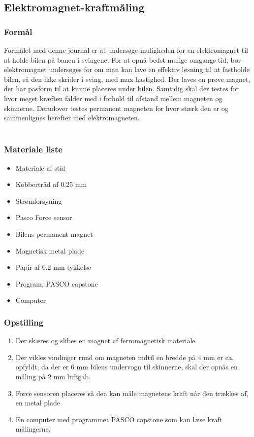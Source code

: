 \newpage 
\subsection{Elektromagnet-kraftmåling}\label{bilag_elektromagnet}
\subsubsection*{Formål}
Formålet med denne journal er at undersøge muligheden for en elektromagnet til at holde bilen på banen i svingene. For at opnå bedst mulige omgangs tid, bør elektromagnet undersøges for om man kan lave en effektiv løsning til at fastholde bilen, så den ikke skrider i sving, med max hastighed. Der laves en prøve magnet, der har pasform til at kunne placeres under bilen. Samtidig skal der testes for hvor meget kræften falder med i forhold til afstand mellem magneten og skinnerne. Derudover testes permanent magneten for hvor stærk den er og sammenlignes herefter med elektromagneten.\\
\\
\subsubsection*{Materiale liste}
\begin{itemize}
	\item Materiale af stål
	\item Kobbertråd af 0.25 mm
	\item Strømforsyning
	\item Pasco Force sensor
	\item Bilens permanent magnet
	\item Magnetisk metal plade
	\item Papir af 0.2 mm tykkelse
	\item Program, PASCO capstone
	\item Computer
\end{itemize}
 
\subsubsection*{Opstilling}
\begin{enumerate}
	\item Der skæres og slibes en magnet af ferromagnetisk materiale 
	\item Der vikles vindinger rund om magneten indtil en bredde på 4 mm er ca. opfyldt, da der er 6 mm bilens undervogn til skinnerne, skal der opnås en måling på 2 mm luftgab.
	\item Force sensoren placeres så den kan måle magnetens kraft når den trækkes af, en metal plade 
	\item En computer med programmet PASCO capstone som kan læse kraft målingerne.
 \end{enumerate}


